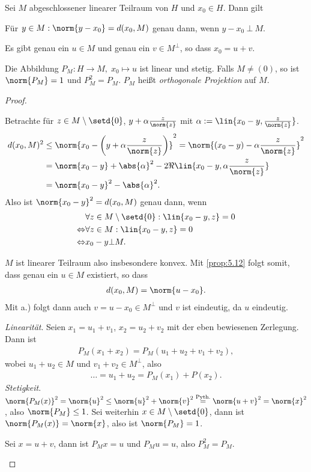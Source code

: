 \begin{prop}[Projektionssatz]
\label{bem:5.14}
Sei $M$ abgeschlossener linearer Teilraum von $H$ und $x_0\in H$. Dann gilt
\begin{propenum}
  \item Für $y\in M : \norm{y-x_0}=d(x_0,M)$ genau dann, wenn $y-x_0\ \bot\ M$.
  \item Es gibt genau ein $u\in M$ und genau ein $v\in M^\bot$, so dass $x_0 =
  u+v$.
  \item Die Abbildung $P_M: H\to M,\; x_0\mapsto u$ ist linear und stetig.
  Falls $M\neq(0)$, so ist $\norm{P_M}=1$ und $P_M^2=P_M$. $P_M$ heißt
  \emph{orthogonale Projektion} auf $M$.\fishhere
\end{propenum}
\end{prop}
\begin{proof}
\begin{proofenum}
  \item Betrachte für $z\in M\setminus\setd{0}$, $y+\alpha\frac{z}{\norm{z}}$
  mit $\alpha:= \lin{x_0-y,\frac{z}{\norm{z}}}$.
\begin{align*}
d(x_0,M)^2 &\le \norm{x_0-\left(y+\alpha\frac{z}{\norm{z}}\right)}^2
= \norm{(x_0-y)-\alpha\frac{z}{\norm{z}}}^2\\
&= \norm{x_0-y}+\abs{\alpha}^2-2\Re\lin{x_0-y,\alpha\frac{z}{\norm{z}}} \\
&= \norm{x_0-y}^2 - \abs{\alpha}^2.
\end{align*}
Also ist $\norm{x_0-y}^2 = d(x_0,M)$ genau dann, wenn
\begin{align*}
&\forall z\in M\setminus\setd{0} : \lin{x_0-y,z} = 0\\
\Leftrightarrow &
\forall z\in M : \lin{x_0-y,z} = 0\\
\Leftrightarrow &
x_0-y\bot M.
\end{align*}
\item $M$ ist linearer Teilraum also insbesondere konvex. Mit \ref{prop:5.12}
folgt somit, dass genau ein $u\in M$ existiert, so dass
\begin{align*}
d(x_0,M) = \norm{u-x_0}.
\end{align*}
Mit a.) folgt dann auch  $v=u-x_0\in M^\bot$ und $v$ ist eindeutig, da $u$
eindeutig.
\item \textit{Linearität}. Seien $x_1=u_1+v_1$, $x_2=u_2+v_2$ mit der eben
bewiesenen Zerlegung. Dann ist
\begin{align*}
P_M(x_1+x_2) = P_M(u_1+u_2+v_1+v_2),
\end{align*}
wobei $u_1+u_2\in M$ und $v_1+v_2\in M^\bot$, also
\begin{align*}
\ldots = u_1+u_2 = P_M(x_1)+P(x_2).
\end{align*}
\textit{Stetigkeit}. $\norm{P_M(x)}^2 = \norm{u}^2\le \norm{u}^2 + \norm{v}^2
\overset{\text{Pyth.}}{=} \norm{u+v}^2 = \norm{x}^2$, also $\norm{P_M}\le 1$.
Sei weiterhin $x\in M\setminus\setd{0}$, dann ist $\norm{P_M(x)} = \norm{x}$,
also ist $\norm{P_M}=1$.

Sei $x=u+v$, dann ist $P_Mx = u$ und $P_M u = u$, also
$P_M^2=P_M$.\qedhere
\end{proofenum}
\end{proof}

